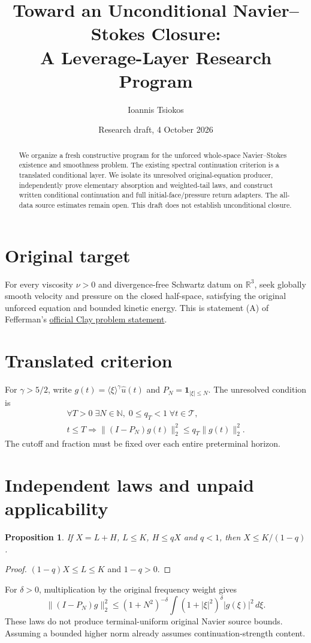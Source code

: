 \documentclass[11pt]{article}
\title{Toward an Unconditional Navier--Stokes Closure:\\A Leverage-Layer Research Program}
\author{Ioannis Tsiokos}
\date{Research draft, 4 October 2026}
\newtheorem{proposition}{Proposition}
\begin{document}
\maketitle
\begin{abstract}
We organize a fresh constructive program for the unforced whole-space
Navier--Stokes existence and smoothness problem. The existing spectral
continuation criterion is a translated conditional layer. We isolate its
unresolved original-equation producer, independently prove elementary
absorption and weighted-tail laws, and construct written conditional
continuation and full initial-face/pressure return adapters. The all-data
source estimates remain open. This draft does not establish unconditional closure.
\end{abstract}
\section{Original target}
For every viscosity $\nu>0$ and divergence-free Schwartz datum on
$\mathbb R^3$, seek globally smooth velocity and pressure on the closed
half-space, satisfying the original unforced equation and bounded kinetic
energy. This is statement (A) of Fefferman's
\href{https://www.claymath.org/wp-content/uploads/2022/06/navierstokes.pdf}{official Clay problem statement}.
\section{Translated criterion}
For $\gamma>5/2$, write $g(t)=\langle\xi\rangle^\gamma\widehat u(t)$ and
$P_N=\mathbf1_{|\xi|\le N}$. The unresolved condition is
\[
\begin{gathered}
\forall T>0\;\exists N\in\mathbb N,\;0\le q_T<1\;\forall t\in\mathcal T,\\
t\le T\Longrightarrow\|(I-P_N)g(t)\|_2^2\le q_T\|g(t)\|_2^2.
\end{gathered}
\]
The cutoff and fraction must be fixed over each entire preterminal horizon.
\section{Independent laws and unpaid applicability}
\begin{proposition}
If $X=L+H$, $L\le K$, $H\le qX$ and $q<1$, then
$X\le K/(1-q)$.
\end{proposition}
\begin{proof}
$(1-q)X\le L\le K$ and $1-q>0$.
\end{proof}
For $\delta>0$, multiplication by the original frequency weight gives
\[
\|(I-P_N)g\|_2^2\le(1+N^2)^{-\delta}
\int (1+|\xi|^2)^\delta|g(\xi)|^2\,d\xi.
\]
These laws do not produce terminal-uniform original Navier source bounds.
Assuming a bounded higher norm already assumes continuation-strength content.
\end{document}
